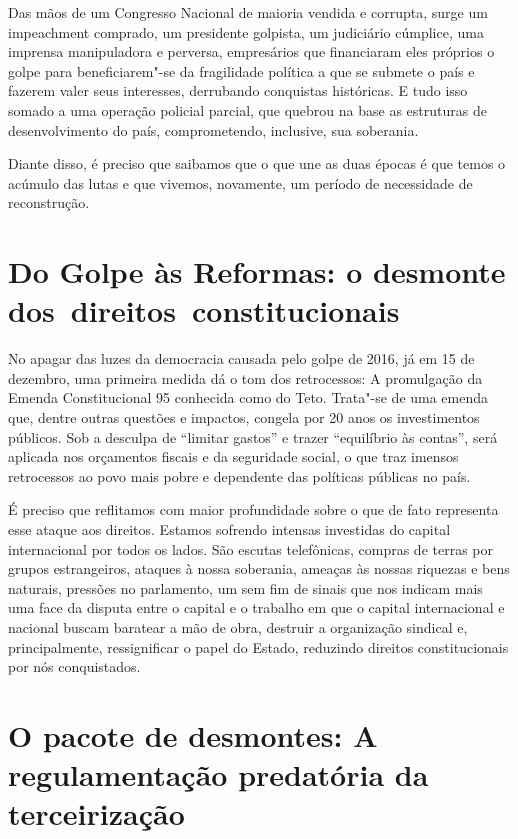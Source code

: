 Das mãos de um Congresso Nacional de maioria vendida e corrupta, surge
um impeachment comprado, um presidente golpista, um judiciário cúmplice,
uma imprensa manipuladora e perversa, empresários que financiaram eles
próprios o golpe para beneficiarem"-se da fragilidade política a que
se submete o país e fazerem valer seus interesses, derrubando conquistas
históricas. E tudo isso somado a uma operação policial parcial, que
quebrou na base as estruturas de desenvolvimento do país, comprometendo,
inclusive, sua soberania.

Diante disso, é preciso que saibamos que o que une as duas épocas é que
temos o acúmulo das lutas e que vivemos, novamente, um período de
necessidade de reconstrução.

\section{Do Golpe às Reformas: o desmonte dos~direitos~constitucionais}

No apagar das luzes da democracia causada pelo golpe de 2016, já em 15
de dezembro, uma primeira medida dá o tom dos retrocessos: A promulgação
da Emenda Constitucional 95 conhecida como  do Teto. Trata"-se de uma
emenda que, dentre outras questões e impactos, congela por 20 anos os
investimentos públicos. Sob a desculpa de ``limitar gastos'' e trazer
``equilíbrio às contas'', será aplicada nos orçamentos fiscais e da
seguridade social, o que traz imensos retrocessos ao povo mais pobre e
dependente das políticas públicas no país.

É preciso que reflitamos com maior profundidade sobre o que de fato representa
esse ataque aos direitos. Estamos sofrendo intensas investidas do
capital internacional por todos os lados. São escutas telefônicas,
compras de terras por grupos estrangeiros, ataques à nossa soberania,
ameaças às nossas riquezas e bens naturais, pressões no parlamento, um
sem fim de sinais que nos indicam mais uma face da disputa entre o
capital e o trabalho em que o capital internacional e nacional buscam
baratear a mão de obra, destruir a organização sindical e,
principalmente, ressignificar o papel do Estado, reduzindo direitos
constitucionais por nós conquistados.

\section{O pacote de desmontes: A regulamentação predatória da
terceirização}

